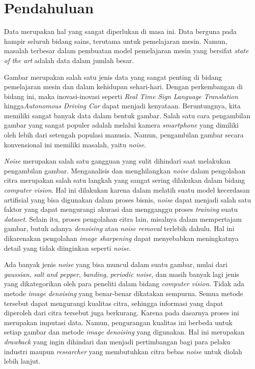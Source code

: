 \documentclass[11pt, a4paper, final]{report}
\begin{document}
\begingroup
\listoffigures
{}  
\let\cleardoublepage\relax
\let\clearpage\relax
\listoftables
{}  
\endgroup

\chapter{Pendahuluan}

Data merupakan hal yang sangat diperlukan di masa ini. Data berguna pada hampir seluruh bidang sains, terutama untuk pemelajaran mesin. Namun, masalah terbesar dalam pembuatan model pemelajaran mesin yang bersifat \textit{state of the art} adalah data dalam jumlah besar.

Gambar merupakan salah satu jenis data yang sangat penting di bidang pemelajaran mesin dan dalam kehidupan sehari-hari. Dengan perkembangan di bidang ini, maka inovasi-inovasi seperti \textit{Real Time Sign Language Translation} hingga\textit{Autonomous Driving Car} dapat menjadi kenyataan. Beruntungnya, kita memiliki sangat banyak data dalam bentuk gambar. Salah satu cara pengambilan gambar yang sangat populer adalah melalui kamera \textit{smartphone} yang dimiliki oleh lebih dari setengah populasi manusia. Namun, pengambilan gambar secara konvensional ini memiliki masalah, yaitu \textit{noise}.

\textit{Noise} merupakan salah satu gangguan yang sulit dihindari saat melakukan pengambilan gambar. Menganalisis dan menghilangkan \textit{noise} dalam pengolahan citra merupakan salah satu langkah yang sangat sering dilakukan dalam bidang \textit{computer vision}. Hal ini dilakukan karena dalam melatih suatu model kecerdasan artifisial yang bisa digunakan dalam proses bisnis, \textit{noise} dapat menjadi salah satu faktor yang dapat mengurangi akurasi dan mengganggu proses \textit{training} suatu \textit{dataset}. Selain itu, proses pengolahan citra lain, misalnya dalam mempertajam gambar, butuh adanya \textit{denoising} atau \textit{noise removal} terlebih dahulu. Hal ini dikarenakan pengolahan \textit{image sharpening} dapat menyebabkan meningkatnya detail yang tidak diinginkan seperti \textit{noise}.

Ada banyak jenis \textit{noise} yang bisa muncul dalam suatu gambar, mulai dari \textit{gaussian}, \textit{salt and pepper}, \textit{banding}, \textit{periodic noise}, dan masih banyak lagi jenis yang dikategorikan oleh para peneliti dalam bidang \textit{computer vision}. Tidak ada metode \textit{image denoising} yang benar-benar dikatakan sempurna. Semua metode tersebut dapat mengurangi kualitas citra, sehingga informasi yang dapat diperoleh dari citra tersebut juga berkurang. Karena pada dasarnya proses ini merupakan imputasi data. Namun, pengurangan kualitas ini berbeda untuk setiap gambar dan metode \textit{image denoising} yang digunakan. Hal ini merupakan \textit{drawback} yang ingin dihindari dan menjadi pertimbangan bagi para pelaku industri maupun \textit{researcher} yang membutuhkan citra bebas \textit{noise} untuk diolah lebih lanjut.
\end{document}
